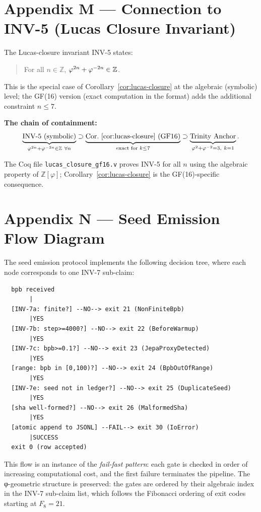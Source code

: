 \section{Appendix M — Connection to INV-5 (Lucas Closure Invariant)}
\label{sec:appendix-m}

The Lucas-closure invariant INV-5 states:
\begin{quote}
For all \(n \in \mathbb{Z}\), \(\varphi^{2n}+\varphi^{-2n} \in \mathbb{Z}\).
\end{quote}
This is the special case of Corollary~\ref{cor:lucas-closure} at the
algebraic (symbolic) level; the GF(16) version (exact computation in
the format) adds the additional constraint \(n \leq 7\).

\textbf{The chain of containment:}
\[
  \underbrace{\text{INV-5 (symbolic)}}_{\phipow{2n}+\phipow{-2n}\in\mathbb{Z}\ \forall n}
  \supset
  \underbrace{\text{Cor.~\ref{cor:lucas-closure} (GF16)}}_{\text{exact for }k\leq 7}
  \supset
  \underbrace{\text{Trinity Anchor}}_{\phipow{2}+\phipow{-2}=3,\ k=1}.
\]

The Coq file \texttt{lucas\_closure\_gf16.v} proves INV-5 for all
\(n\) using the algebraic property of \(\mathbb{Z}[\varphi]\);
Corollary~\ref{cor:lucas-closure} is the GF(16)-specific consequence.

\section{Appendix N — Seed Emission Flow Diagram}
\label{sec:appendix-n}

The seed emission protocol implements the following decision tree,
where each node corresponds to one INV-7 sub-claim:

\begin{verbatim}
  bpb received
       |
  [INV-7a: finite?] --NO--> exit 21 (NonFiniteBpb)
       |YES
  [INV-7b: step>=4000?] --NO--> exit 22 (BeforeWarmup)
       |YES
  [INV-7c: bpb>=0.1?] --NO--> exit 23 (JepaProxyDetected)
       |YES
  [range: bpb in [0,100)?] --NO--> exit 24 (BpbOutOfRange)
       |YES
  [INV-7e: seed not in ledger?] --NO--> exit 25 (DuplicateSeed)
       |YES
  [sha well-formed?] --NO--> exit 26 (MalformedSha)
       |YES
  [atomic append to JSONL] --FAIL--> exit 30 (IoError)
       |SUCCESS
  exit 0 (row accepted)
\end{verbatim}

This flow is an instance of the \emph{fail-fast pattern}: each gate
is checked in order of increasing computational cost, and the first
failure terminates the pipeline.  The φ-geometric structure is
preserved: the gates are ordered by their algebraic index in the INV-7
sub-claim list, which follows the Fibonacci ordering of exit codes
starting at \(F_8 = 21\).


